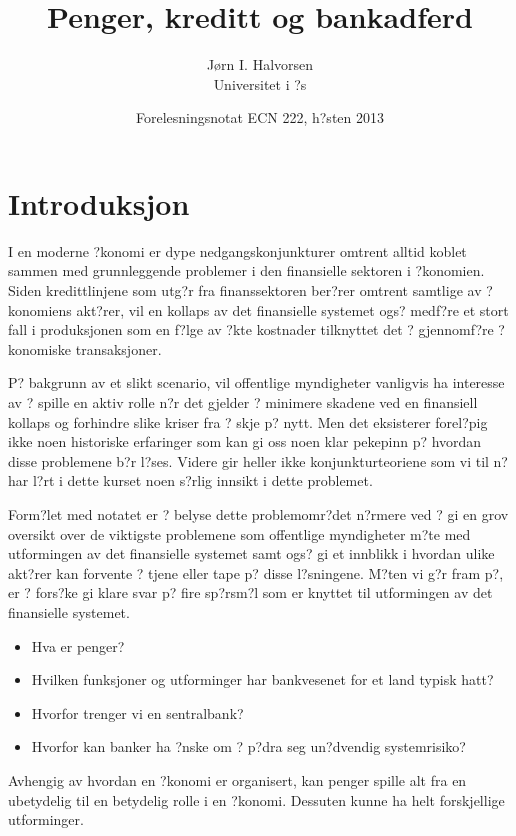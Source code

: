 \documentclass[a4paper,notitlepage]{article}
\begin{document}
\title[Triola kapittel 1]{Penger, kreditt og bankadferd}
\author[JIH]{J\o rn I. Halvorsen \\ Universitet i ?s}
\date[Sj\o krigsskolen 2007]{Forelesningsnotat ECN 222, h?sten 2013}
\maketitle
\section{Introduksjon}
I en moderne ?konomi er dype nedgangskonjunkturer omtrent alltid koblet sammen med grunnleggende problemer i den finansielle sektoren i ?konomien.  Siden kredittlinjene som utg?r fra finanssektoren ber?rer omtrent samtlige av ?konomiens akt?rer, vil en kollaps av det finansielle systemet ogs? medf?re et stort fall i produksjonen som en f?lge av ?kte kostnader tilknyttet det ? gjennomf?re ?konomiske transaksjoner.

P? bakgrunn av et slikt scenario, vil offentlige myndigheter vanligvis ha interesse av ? spille en aktiv rolle n?r det gjelder ? minimere skadene ved en finansiell kollaps og forhindre slike kriser fra ? skje p? nytt.
Men det eksisterer forel?pig ikke noen historiske erfaringer som kan gi oss noen klar pekepinn p? hvordan disse problemene b?r l?ses. Videre gir heller ikke konjunkturteoriene som vi til n? har l?rt i dette kurset noen s?rlig innsikt i dette problemet.

Form?let med notatet er ? belyse dette problemomr?det n?rmere ved ? gi en grov oversikt over de viktigste problemene som offentlige myndigheter m?te med utformingen av det finansielle systemet samt ogs? gi et innblikk i hvordan ulike akt?rer kan forvente ? tjene eller tape p? disse l?sningene.
M?ten vi g?r fram p?, er ? fors?ke gi klare svar p? fire sp?rsm?l som er knyttet til utformingen av det finansielle systemet.
\begin{itemize}
\item Hva er penger?
\item Hvilken funksjoner og utforminger har bankvesenet for et land typisk hatt?
\item Hvorfor trenger vi en sentralbank?
\item Hvorfor kan banker ha ?nske om ? p?dra seg un?dvendig systemrisiko?
\end{itemize}
Avhengig av hvordan en ?konomi er organisert, kan penger spille alt fra en ubetydelig til en betydelig rolle i en ?konomi.  Dessuten kunne ha helt forskjellige utforminger.
\end{document}
